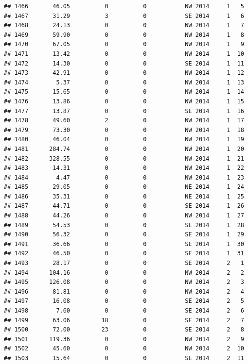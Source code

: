 \documentclass[
]{article}
\begin{document}
\begin{verbatim}
## 1466       46.05          0          0           NW 2014     1   5
## 1467       31.29          3          0           SE 2014     1   6
## 1468       24.13          0          0           NW 2014     1   7
## 1469       59.90          0          0           NW 2014     1   8
## 1470       67.05          0          0           NW 2014     1   9
## 1471       13.42          0          0           NW 2014     1  10
## 1472       14.30          0          0           SE 2014     1  11
## 1473       42.91          0          0           NW 2014     1  12
## 1474        5.37          0          0           NW 2014     1  13
## 1475       15.65          0          0           NW 2014     1  14
## 1476       13.86          0          0           NW 2014     1  15
## 1477       13.87          0          0           SE 2014     1  16
## 1478       49.60          2          0           NW 2014     1  17
## 1479       73.30          0          0           NW 2014     1  18
## 1480       46.04          0          0           NW 2014     1  19
## 1481      284.74          0          0           NW 2014     1  20
## 1482      328.55          0          0           NW 2014     1  21
## 1483       14.31          0          0           NW 2014     1  22
## 1484        4.47          0          0           NW 2014     1  23
## 1485       29.05          0          0           NE 2014     1  24
## 1486       35.31          0          0           NE 2014     1  25
## 1487       44.71          0          0           SE 2014     1  26
## 1488       44.26          0          0           NW 2014     1  27
## 1489       54.53          0          0           SE 2014     1  28
## 1490       56.32          0          0           SE 2014     1  29
## 1491       36.66          0          0           SE 2014     1  30
## 1492       46.50          0          0           SE 2014     1  31
## 1493       28.17          0          0           SE 2014     2   1
## 1494      104.16          0          0           NW 2014     2   2
## 1495      126.08          0          0           NW 2014     2   3
## 1496       81.81          0          0           NW 2014     2   4
## 1497       16.08          0          0           SE 2014     2   5
## 1498        7.60          0          0           SE 2014     2   6
## 1499       63.06         18          0           SE 2014     2   7
## 1500       72.00         23          0           SE 2014     2   8
## 1501      119.36          0          0           NW 2014     2   9
## 1502       45.60          0          0           NW 2014     2  10
## 1503       15.64          0          0           SE 2014     2  11

\end{verbatim}
\end{document}
